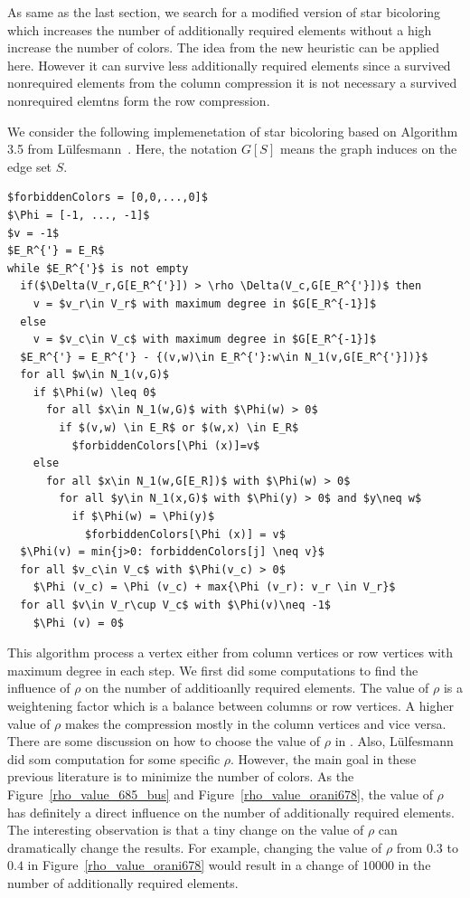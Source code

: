 \documentclass[12pt, oneside]{book}
\newcommand{\figref}[1]{Figure~\protect\ref{#1}}
\begin{document}
As same as the last section, we search for a modified version of star bicoloring
which increases the number of additionally required elements without 
a high increase the number of colors. The idea from the new heuristic 
can be applied here. However it can survive less additionally required
elements since a survived nonrequired elements from the column compression
it is not necessary a survived nonrequired elemtns form the row compression.

We consider the following implemenetation of star bicoloring based on 
Algorithm 3.5 from Lülfesmann~\cite{Lulfesmann2012Fap}.
Here, the notation $G[S]$ means the graph induces on the edge set $S$.
\begin{lstlisting}[mathescape]
$forbiddenColors = [0,0,...,0]$
$\Phi = [-1, ..., -1]$
$v = -1$
$E_R^{'} = E_R$
while $E_R^{'}$ is not empty 
  if($\Delta(V_r,G[E_R^{'}]) > \rho \Delta(V_c,G[E_R^{'}])$ then
    v = $v_r\in V_r$ with maximum degree in $G[E_R^{-1}]$
  else
    v = $v_c\in V_c$ with maximum degree in $G[E_R^{-1}]$
  $E_R^{'} = E_R^{'} - {(v,w)\in E_R^{'}:w\in N_1(v,G[E_R^{'}])}$
  for all $w\in N_1(v,G)$
    if $\Phi(w) \leq 0$
      for all $x\in N_1(w,G)$ with $\Phi(w) > 0$
        if $(v,w) \in E_R$ or $(w,x) \in E_R$
          $forbiddenColors[\Phi (x)]=v$
    else
      for all $x\in N_1(w,G[E_R])$ with $\Phi(w) > 0$
        for all $y\in N_1(x,G)$ with $\Phi(y) > 0$ and $y\neq w$
          if $\Phi(w) = \Phi(y)$
            $forbiddenColors[\Phi (x)] = v$
  $\Phi(v) = min{j>0: forbiddenColors[j] \neq v}$
  for all $v_c\in V_c$ with $\Phi(v_c) > 0$
    $\Phi (v_c) = \Phi (v_c) + max{\Phi (v_r): v_r \in V_r}$
  for all $v\in V_r\cup V_c$ with $\Phi(v)\neq -1$
    $\Phi (v) = 0$  
\end{lstlisting}
This algorithm process a vertex either from column vertices
or row vertices with maximum degree in each step.
We first did some computations to find the influence of $\rho$ on the 
number of additioanlly required elements. The value of $\rho$ is a weightening factor which 
is a balance between columns or row vertices. A higher value of $\rho$
makes the compression mostly in the column vertices and vice versa.
There are some discussion on how to choose the value of $\rho$ in 
\cite{Gebremedhin05whatcolor}. Also, 
Lülfesmann~\cite{Lulfesmann2012Fap,LulfesmannMaster} did som computation for some
specific $\rho$. 
However, the main goal in these previous literature
is to minimize the number of colors. 
As the \figref{rho_value_685_bus} and \figref{rho_value_orani678},
the value of $\rho$ has definitely a direct influence on
the number of additionally required elements. 
The interesting observation is that a tiny change
on the value of $\rho$ can dramatically change the 
results. For example, changing the value of $\rho$ from
$0.3$ to $0.4$ in \figref{rho_value_orani678} would result
in a change of $10000$ in the number of additionally required elements.
\end{document}
